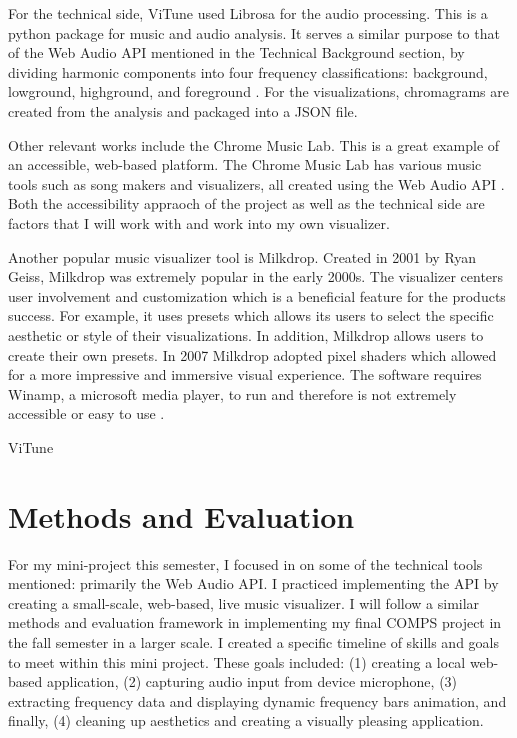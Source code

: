 \documentclass[10pt,twocolumn]{article}
\begin{document}
For the technical side, ViTune used Librosa for the audio processing. This is a python package for music and audio analysis. It serves a similar purpose to that of the Web Audio API mentioned in the Technical Background section, by dividing harmonic components into four frequency classifications: background, lowground, highground, and foreground \cite{deja_vitune_2020}. For the visualizations, chromagrams are created from the analysis and packaged into a JSON file. 

Other relevant works include the Chrome Music Lab. This is a great example of an accessible, web-based platform. The Chrome Music Lab has various music tools such as song makers and visualizers, all created using the Web Audio API \cite{noauthor_chrome_nodate}. Both the accessibility appraoch of the project as well as the technical side are factors that I will work with and work into my own visualizer.

Another popular music visualizer tool is Milkdrop. Created in 2001 by Ryan Geiss, Milkdrop was extremely popular in the early 2000s. The visualizer centers user involvement and customization which is a beneficial feature for the products success. For example, it uses presets which allows its users to select the specific aesthetic or style of their visualizations. In addition, Milkdrop allows users to create their own presets. In 2007 Milkdrop adopted pixel shaders which allowed for a more impressive and immersive visual experience. The software requires Winamp, a microsoft media player, to run and therefore is not extremely accessible or easy to use \cite{noauthor_geisswerks_nodate}.

ViTune \cite{deja_vitune_2020}




 
\section{Methods and Evaluation}
For my mini-project this semester, I focused in on some of the technical tools mentioned: primarily the Web Audio API. I practiced implementing the API by creating a small-scale, web-based, live music visualizer. I will follow a similar methods and evaluation framework in implementing my final COMPS project in the fall semester in a larger scale.
I created a specific timeline of skills and goals to meet within this mini project. These goals included: (1) creating a local web-based application, (2) capturing audio input from device microphone, (3) extracting frequency data and displaying dynamic frequency bars animation, and finally, (4) cleaning up aesthetics and creating a visually pleasing application. 
\end{document}
